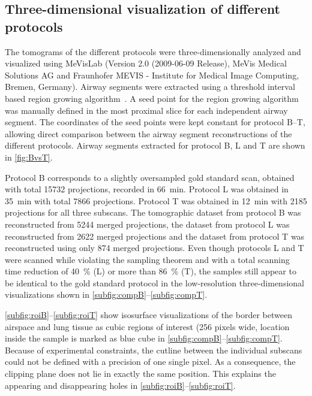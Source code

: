 \subsection[\threed visualization of different protocols]{Three-dimensional visualization of different protocols}
\label{subsec:comparison}
The tomograms of the different protocols were three-dimensionally analyzed and visualized using MeVisLab (Version 2.0 (2009-06-09 Release), MeVis Medical Solutions AG and Fraunhofer MEVIS - Institute for Medical Image Computing, Bremen, Germany). Airway segments were extracted using a threshold interval based region growing algorithm~\cite{Zucker1976}. A seed point for the region growing algorithm was manually defined in the most proximal slice for each independent airway segment. The coordinates of the seed points were kept constant for protocol B--T, allowing direct comparison between the airway segment reconstructions of the different protocols. Airway segments extracted for protocol B, L and T are shown in \autoref{fig:BvsT}.

Protocol B corresponds to a slightly oversampled gold standard scan, obtained with total 15732 projections, recorded in \SI{66}{\minute}. Protocol L was obtained in \SI{35}{\minute} with total 7866 projections. Protocol T was obtained in \SI{12}{\minute} with 2185 projections for all three subscans. The tomographic dataset from protocol B was reconstructed from 5244 merged projections, the dataset from protocol L was reconstructed from 2622 merged projections and the dataset from protocol T was reconstructed using only 874 merged projections. Even though protocols L and T were scanned while violating the sampling theorem and with a total scanning time reduction of \SI{40}{\percent} (L) or more than \SI{86}{\percent} (T), the samples still appear to be identical to the gold standard protocol in the low-resolution three-dimensional visualizations shown in \autoref{subfig:compB}--\ref{subfig:compT}.

\autoref{subfig:roiB}--\ref{subfig:roiT} show isosurface visualizations of the border between airspace and lung tissue as cubic regions of interest (256 pixels wide, location inside the sample is marked as blue cube in \autoref{subfig:compB}--\ref{subfig:compT}. Because of experimental constraints, the cutline between the individual subscans could not be defined with a precision of one single pixel. As a consequence, the clipping plane does not lie in exactly the same position. This explains the appearing and disappearing holes in \autoref{subfig:roiB}--\ref{subfig:roiT}.

